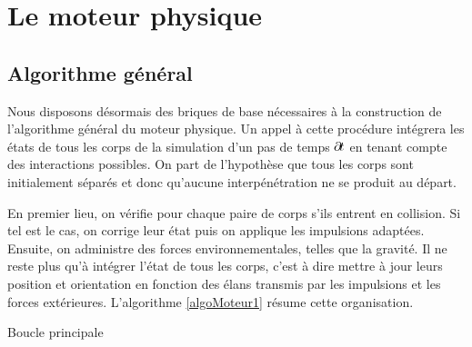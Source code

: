 \section{Le moteur physique}

\subsection{Algorithme général}

Nous disposons désormais des briques de base nécessaires à la
construction de l'algorithme général du moteur physique. Un appel à
cette procédure intégrera les états de tous les corps de la simulation
d'un pas de temps $\partial \! t$ en tenant compte des interactions
possibles. On part de l'hypothèse que tous les corps sont initialement
séparés et donc qu'aucune interpénétration ne se produit au départ.

En premier lieu, on vérifie pour chaque paire de corps s'ils entrent
en collision. Si tel est le cas, on corrige leur état puis on applique
les impulsions adaptées. Ensuite, on administre des forces
environnementales, telles que la gravité. Il ne reste plus qu'à
intégrer l'état de tous les corps, c'est à dire mettre à jour leurs
position et orientation en fonction des élans transmis par les
impulsions et les forces extérieures. L'algorithme \ref{algoMoteur1}
résume cette organisation.

\begin{algorithm}[h]
  \caption{Boucle principale}
  \label{algoMoteur1}
  \dontprintsemicolon
  \BlankLine
  \BlankLine
  \BlankLine
\end{algorithm}

